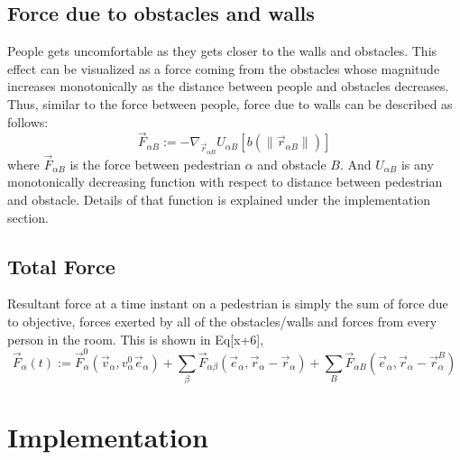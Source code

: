 \documentclass[11pt]{article}
\begin{document}
\subsection{Force due to obstacles and walls}
People gets uncomfortable as they gets closer to the walls and obstacles. This effect can be visualized as a force coming from the obstacles whose magnitude increases monotonically as the distance between people and obstacles decreases. Thus, similar to the force between people, force due to walls can be described as follows:
\begin{equation}
    \vec{F}_{\alpha B}:=-\nabla_{\vec{r}_{\alpha B}}U_{\alpha B}[b(\|\vec{r}_{\alpha B}\|)]
\end{equation}
where $ \vec{F}_{\alpha B}$ is the force between pedestrian $\alpha$ and obstacle $B$. And $U_{\alpha B}$ is any monotonically decreasing function with respect to distance between pedestrian and obstacle. Details of that function is explained under the implementation section.

\subsection{Total Force}
Resultant force at a time instant on a pedestrian is simply the sum of force due to objective, forces exerted by all of the obstacles/walls and forces from every person in the room. This is shown in Eq[x+6],
\begin{equation}
    \vec{F}_\alpha(t):=\vec{F}_\alpha^0(\vec{v}_\alpha,v_\alpha^0\vec{e}_\alpha)+\sum_\beta\vec{F}_{\alpha\beta}(\vec{e}_\alpha,\vec{r}_\alpha-\vec{r}_\alpha)+\sum_B\vec{F}_{\alpha B}(\vec{e}_\alpha,\vec{r}_\alpha-\vec{r}_\alpha^B)
\end{equation}

\section{Implementation}
\end{document}
